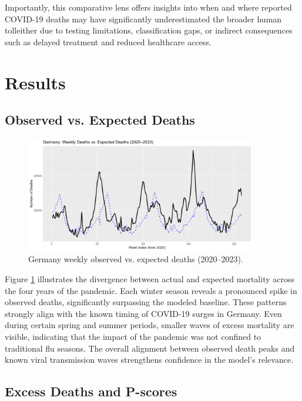 \documentclass[a4paper,11pt]{article}
\begin{document}
Importantly, this comparative lens offers insights into when and where reported COVID-19 deaths may have significantly underestimated the broader human toll\textemdash either due to testing limitations, classification gaps, or indirect consequences such as delayed treatment and reduced healthcare access.

\section{Results}

\subsection{Observed vs. Expected Deaths}

\begin{figure}[h]
\centering
\includegraphics[width=0.9\textwidth]{Figure1-germany-deaths-vs-expected.png}
\caption{Germany weekly observed vs. expected deaths (2020–2023).}\label{f1}
\end{figure}

Figure \ref{f1} illustrates the divergence between actual and expected mortality across the four years of the pandemic. Each winter season reveals a pronounced spike in observed deaths, significantly surpassing the modeled baseline. These patterns strongly align with the known timing of COVID-19 surges in Germany. Even during certain spring and summer periods, smaller waves of excess mortality are visible, indicating that the impact of the pandemic was not confined to traditional flu seasons. The overall alignment between observed death peaks and known viral transmission waves strengthens confidence in the model’s relevance.

\subsection{Excess Deaths and P-scores}
\end{document}
